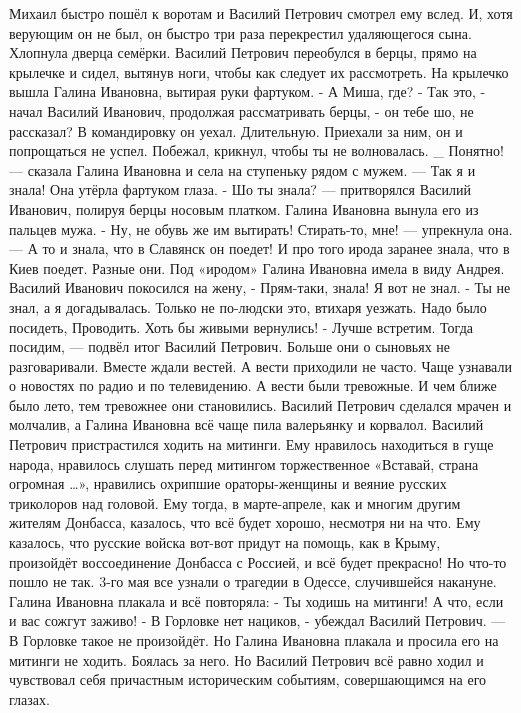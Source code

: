 Михаил быстро пошёл к воротам и Василий Петрович смотрел ему вслед. И, хотя верующим он не был, он быстро три раза перекрестил удаляющегося сына. Хлопнула дверца семёрки.
Василий Петрович переобулся в берцы, прямо на крылечке и сидел, вытянув ноги, чтобы как следует их рассмотреть. На крылечко вышла Галина Ивановна, вытирая руки фартуком.
- А Миша, где?
- Так это, - начал Василий Иванович, продолжая рассматривать берцы, - он тебе шо, не рассказал? В командировку он уехал. Длительную. Приехали за ним, он и попрощаться не успел. Побежал, крикнул, чтобы ты не волновалась.
_ Понятно! --- сказала Галина Ивановна и села на ступеньку рядом с мужем. --- Так я и знала!
Она утёрла фартуком глаза.
- Шо ты знала? --- притворялся Василий Иванович, полируя берцы носовым платком. Галина Ивановна вынула его из пальцев мужа.
- Ну, не обувь же им вытирать! Стирать-то, мне! --- упрекнула она. --- А то и знала, что в Славянск он поедет! И про того ирода заранее знала, что в Киев поедет. Разные они.
Под «иродом» Галина Ивановна имела в виду Андрея.
Василий Иванович покосился на жену,
- Прям-таки, знала! Я вот не знал.
- Ты не знал, а я догадывалась. Только не по-людски это, втихаря уезжать. Надо было посидеть, Проводить. Хоть бы живыми вернулись!
- Лучше встретим. Тогда посидим, --- подвёл итог Василий Петрович.
Больше они о сыновьях не разговаривали. Вместе ждали вестей. А вести приходили не часто. Чаще узнавали о новостях по радио и по телевидению. А вести были тревожные. И чем ближе было лето, тем тревожнее они становились. Василий Петрович сделался мрачен и молчалив, а Галина Ивановна всё чаще пила валерьянку и корвалол.
Василий Петрович пристрастился ходить на митинги. Ему нравилось находиться в гуще народа, нравилось слушать перед митингом торжественное «Вставай, страна огромная …», нравились охрипшие ораторы-женщины и веяние русских триколоров над головой. Ему тогда, в марте-апреле, как и многим другим жителям Донбасса, казалось, что всё будет хорошо, несмотря ни на что. Ему казалось, что русские войска вот-вот придут на помощь, как в Крыму, произойдёт воссоединение Донбасса с Россией, и всё будет прекрасно!
Но что-то пошло не так. 3-го мая все узнали о трагедии в Одессе, случившейся накануне.
Галина Ивановна плакала и всё повторяла: - Ты ходишь на митинги! А что, если и вас сожгут заживо!
- В Горловке нет нациков, - убеждал Василий Петрович. --- В Горловке такое не произойдёт.
Но Галина Ивановна плакала и просила его на митинги не ходить. Боялась за него. Но Василий Петрович всё равно ходил и чувствовал себя причастным историческим событиям, совершающимся на его глазах.

